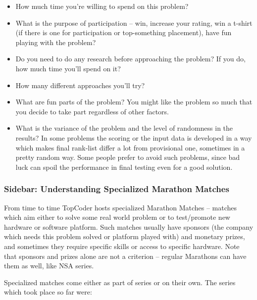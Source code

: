 \begin{itemize}
\item
  How much time you're willing to spend on this problem?
\item
  What is the purpose of participation -- win, increase your rating, win
  a t-shirt (if there is one for participation or top-something
  placement), have fun playing with the problem?
\item
  Do you need to do any research before approaching the problem? If you
  do, how much time you'll spend on it?
\item
  How many different approaches you'll try?
\item
  What are fun parts of the problem? You might like the problem so much
  that you decide to take part regardless of other factors.
\item
  What is the variance of the problem and the level of randomness in the
  results? In some problems the scoring or the input data is developed
  in a way which makes final rank-list differ a lot from provisional
  one, sometimes in a pretty random way. Some people prefer to avoid
  such problems, since bad luck can spoil the performance in final
  testing even for a good solution.
\end{itemize}

\hypertarget{sidebar-understanding-specialized-marathon-matches}{%
\subsubsection{Sidebar: Understanding Specialized Marathon
Matches}\label{sidebar-understanding-specialized-marathon-matches}}

From time to time TopCoder hosts specialized Marathon Matches -- matches
which aim either to solve some real world problem or to test/promote new
hardware or software platform. Such matches usually have sponsors (the
company which needs this problem solved or platform played with) and
monetary prizes, and sometimes they require specific skills or access to
specific hardware. Note that sponsors and prizes alone are not a
criterion -- regular Marathons can have them as well, like NSA series.

Specialized matches come either as part of series or on their own. The
series which took place so far were:

